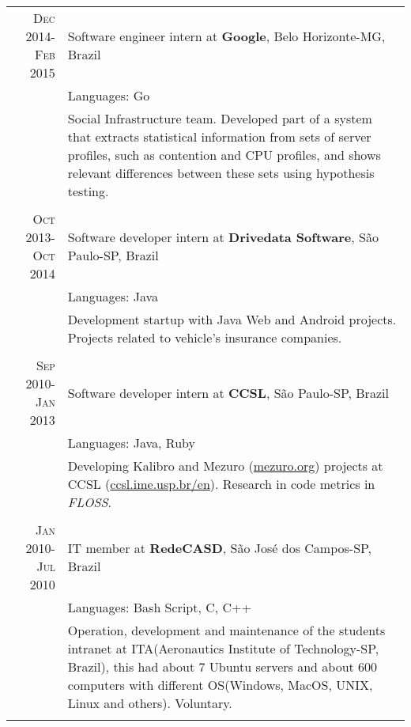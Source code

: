 \documentclass[a4paper,10pt]{article} %
\begin{document}
\begin{tabular}{r|p{11cm}}
\textsc{Dec 2014-Feb 2015} & Software engineer intern at \textbf{Google}, Belo Horizonte-MG, Brazil \emph{}\\
& \footnotesize{Languages: Go}\\
       & \footnotesize{Social Infrastructure team. Developed part of a system that extracts statistical information from sets of server profiles, such as contention and CPU profiles, and shows relevant differences between these sets using hypothesis testing.} \\
       \multicolumn{2}{c}{} \\
       

\textsc{Oct 2013-Oct 2014} & Software developer intern at \textbf{Drivedata Software}, São Paulo-SP, Brazil \emph{}\\
& \footnotesize{Languages: Java}\\
       & \footnotesize{Development startup with Java Web and Android projects. Projects related to vehicle's insurance companies.} \\
       \multicolumn{2}{c}{} \\
	

\textsc{Sep 2010-Jan 2013} & Software developer intern at \textbf{CCSL}, São Paulo-SP, Brazil \emph{}\\
& \footnotesize{Languages: Java, Ruby}\\
       & \footnotesize{Developing Kalibro and Mezuro (\href{http://mezuro.org}{mezuro.org}) projects at CCSL (\href{http://ccsl.ime.usp.br/en}{ccsl.ime.usp.br/en}). Research in code metrics in \emph{FLOSS}.}\\
\multicolumn{2}{c}{} \\


\textsc{Jan 2010-Jul 2010} & IT member at \textbf{RedeCASD}, São José dos Campos-SP, Brazil \emph{}\\
& \footnotesize{Languages: Bash Script, C, C++}\\
       & \footnotesize{Operation, development and maintenance of the students intranet at ITA(Aeronautics Institute of
       Technology-SP, Brazil), this had about 7 Ubuntu servers and about 600 computers with different
       OS(Windows, MacOS, UNIX, Linux and others). Voluntary.}\\
\multicolumn{2}{c}{} \\


\end{tabular}
\end{document}
